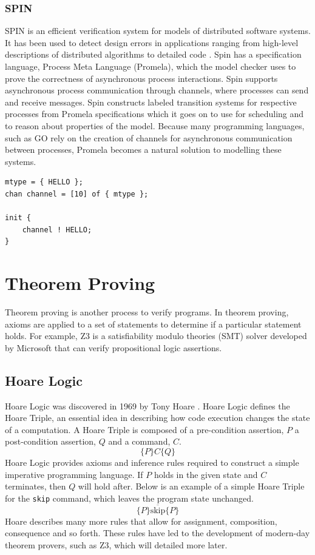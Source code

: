 \subsubsection*{\textbf{SPIN}}
SPIN is an efficient verification system for models of distributed software systems. It has been used to detect design errors in applications ranging from high-level descriptions of distributed algorithms to detailed code \cite{spin}. Spin has a specification language, Process Meta Language (Promela), which the model checker uses to prove the correctness of asynchronous process interactions. Spin supports asynchronous process communication through channels, where processes can send and receive messages. Spin constructs labeled transition systems for respective processes from Promela specifications which it goes on to use for scheduling and to reason about properties of the model. Because many programming languages, such as GO \cite{go} rely on the creation of channels for asynchronous communication between processes, Promela becomes a natural solution to modelling these systems.
\begin{lstlisting}[caption={Example of a Promela specification that enqueues a message in a channel}]
mtype = { HELLO };
chan channel = [10] of { mtype };

init {
    channel ! HELLO;
}
\end{lstlisting}

\section[]{Theorem Proving}
Theorem proving is another process to verify programs. In theorem proving, axioms are applied to a set of statements to determine if a particular statement holds. For example, Z3 \cite{z3} is a satisfiability modulo theories (SMT) solver developed by Microsoft that can verify propositional logic assertions.
\subsection[]{Hoare Logic}
Hoare Logic was discovered in 1969 by Tony Hoare \cite{hoare_logic}. Hoare Logic defines the Hoare Triple, an essential idea in describing how code execution changes the state of a computation. A Hoare Triple is composed of a pre-condition assertion, $P$ a post-condition assertion, $Q$ and a command, $C$.
\[
\{P\}C\{Q\}
\]
Hoare Logic provides axioms and inference rules required to construct a simple imperative programming language. If $P$ holds in the given state and $C$ terminates, then $Q$ will hold after. Below is an example of a simple Hoare Triple for the \texttt{skip} command, which leaves the program state unchanged.
\[
\overline{\{P\}\text{skip}\{P\}}
\]
Hoare describes many more rules that allow for assignment, composition, consequence and so forth. These rules have led to the development of modern-day theorem provers, such as Z3, which will detailed more later.
